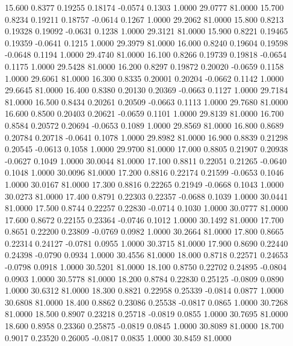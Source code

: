   15.600   0.8377   0.19255   0.18174  -0.0574   0.1303   1.0000  29.0777  81.0000
  15.700   0.8234   0.19211   0.18757  -0.0614   0.1267   1.0000  29.2062  81.0000
  15.800   0.8213   0.19328   0.19092  -0.0631   0.1238   1.0000  29.3121  81.0000
  15.900   0.8221   0.19465   0.19359  -0.0641   0.1215   1.0000  29.3979  81.0000
  16.000   0.8240   0.19604   0.19598  -0.0648   0.1194   1.0000  29.4740  81.0000
  16.100   0.8266   0.19739   0.19818  -0.0654   0.1175   1.0000  29.5428  81.0000
  16.200   0.8297   0.19872   0.20020  -0.0659   0.1158   1.0000  29.6061  81.0000
  16.300   0.8335   0.20001   0.20204  -0.0662   0.1142   1.0000  29.6645  81.0000
  16.400   0.8380   0.20130   0.20369  -0.0663   0.1127   1.0000  29.7184  81.0000
  16.500   0.8434   0.20261   0.20509  -0.0663   0.1113   1.0000  29.7680  81.0000
  16.600   0.8500   0.20403   0.20621  -0.0659   0.1101   1.0000  29.8139  81.0000
  16.700   0.8584   0.20572   0.20694  -0.0653   0.1089   1.0000  29.8569  81.0000
  16.800   0.8689   0.20784   0.20718  -0.0641   0.1078   1.0000  29.8982  81.0000
  16.900   0.8839   0.21298   0.20545  -0.0613   0.1058   1.0000  29.9700  81.0000
  17.000   0.8805   0.21907   0.20938  -0.0627   0.1049   1.0000  30.0044  81.0000
  17.100   0.8811   0.22051   0.21265  -0.0640   0.1048   1.0000  30.0096  81.0000
  17.200   0.8816   0.22174   0.21599  -0.0653   0.1046   1.0000  30.0167  81.0000
  17.300   0.8816   0.22265   0.21949  -0.0668   0.1043   1.0000  30.0273  81.0000
  17.400   0.8791   0.22303   0.22357  -0.0688   0.1039   1.0000  30.0441  81.0000
  17.500   0.8744   0.22257   0.22830  -0.0714   0.1030   1.0000  30.0777  81.0000
  17.600   0.8672   0.22155   0.23364  -0.0746   0.1012   1.0000  30.1492  81.0000
  17.700   0.8651   0.22200   0.23809  -0.0769   0.0982   1.0000  30.2664  81.0000
  17.800   0.8665   0.22314   0.24127  -0.0781   0.0955   1.0000  30.3715  81.0000
  17.900   0.8690   0.22440   0.24398  -0.0790   0.0934   1.0000  30.4556  81.0000
  18.000   0.8718   0.22571   0.24653  -0.0798   0.0918   1.0000  30.5201  81.0000
  18.100   0.8750   0.22702   0.24895  -0.0804   0.0903   1.0000  30.5778  81.0000
  18.200   0.8784   0.22830   0.25125  -0.0809   0.0890   1.0000  30.6312  81.0000
  18.300   0.8821   0.22958   0.25339  -0.0814   0.0877   1.0000  30.6808  81.0000
  18.400   0.8862   0.23086   0.25538  -0.0817   0.0865   1.0000  30.7268  81.0000
  18.500   0.8907   0.23218   0.25718  -0.0819   0.0855   1.0000  30.7695  81.0000
  18.600   0.8958   0.23360   0.25875  -0.0819   0.0845   1.0000  30.8089  81.0000
  18.700   0.9017   0.23520   0.26005  -0.0817   0.0835   1.0000  30.8459  81.0000
